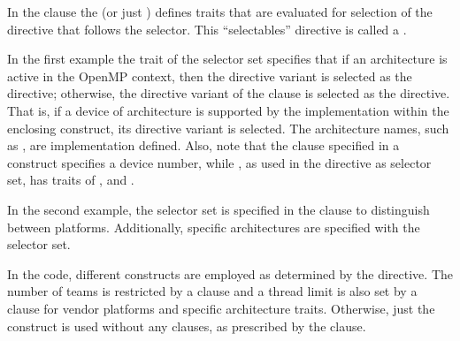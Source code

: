 In the  clause the  (or just ) defines traits that are
evaluated for selection of the directive that follows the selector. 
This ``selectables'' directive is called a .

In the first example the  trait of the
 selector set specifies that if an  architecture is
active in the OpenMP context, then the 
directive variant is selected as the directive; otherwise, the 
directive variant of the  clause is selected as the directive.
That is, if a device of  architecture is supported by the implementation within
the enclosing  construct, its directive variant is selected.
The architecture names, such as , are implementation defined.
Also, note that the  clause specified in a  construct specifies
a device number, while , as used in the 
directive as selector set, has traits of ,  and .




In the second example, the  selector set is specified
in the  clause to distinguish between platforms. 
Additionally, specific architectures are specified with the 
selector set.

In the code, different  constructs are employed as determined
by the  directive.
The number of teams is restricted by a  clause
and a thread limit is also set by a  clause for 
vendor platforms and specific architecture
traits.  Otherwise, just the  construct is used without
any clauses, as prescribed by the  clause.



\clearpage



